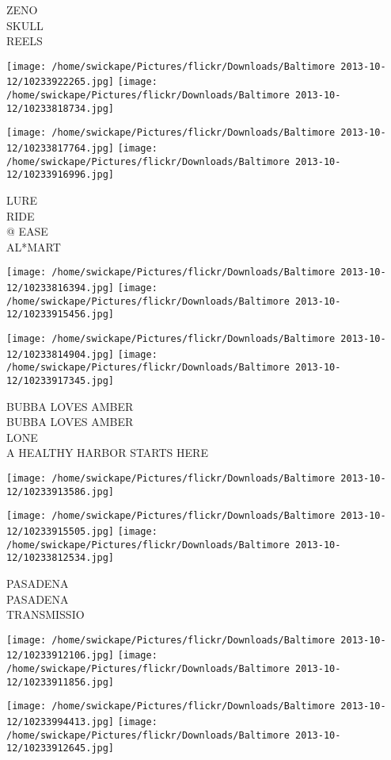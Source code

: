 \documentclass[10pt,letterpaper]{article}
\begin{document}
ZENO\\
SKULL\\
REELS
\pagebreak

\texttt{[image: /home/swickape/Pictures/flickr/Downloads/Baltimore 2013-10-12/10233922265.jpg]}
\texttt{[image: /home/swickape/Pictures/flickr/Downloads/Baltimore 2013-10-12/10233818734.jpg]}

\texttt{[image: /home/swickape/Pictures/flickr/Downloads/Baltimore 2013-10-12/10233817764.jpg]}
\texttt{[image: /home/swickape/Pictures/flickr/Downloads/Baltimore 2013-10-12/10233916996.jpg]}

LURE\\
RIDE\\
@ EASE\\
AL*MART
\pagebreak

\texttt{[image: /home/swickape/Pictures/flickr/Downloads/Baltimore 2013-10-12/10233816394.jpg]}
\texttt{[image: /home/swickape/Pictures/flickr/Downloads/Baltimore 2013-10-12/10233915456.jpg]}

\texttt{[image: /home/swickape/Pictures/flickr/Downloads/Baltimore 2013-10-12/10233814904.jpg]}
\texttt{[image: /home/swickape/Pictures/flickr/Downloads/Baltimore 2013-10-12/10233917345.jpg]}

BUBBA LOVES AMBER\\
BUBBA LOVES AMBER\\
LONE\\
A HEALTHY HARBOR STARTS HERE
\pagebreak

\texttt{[image: /home/swickape/Pictures/flickr/Downloads/Baltimore 2013-10-12/10233913586.jpg]}

\vspace{0.25in}
\texttt{[image: /home/swickape/Pictures/flickr/Downloads/Baltimore 2013-10-12/10233915505.jpg]}
\texttt{[image: /home/swickape/Pictures/flickr/Downloads/Baltimore 2013-10-12/10233812534.jpg]}

PASADENA\\
PASADENA\\
TRANSMISSIO
\pagebreak

\texttt{[image: /home/swickape/Pictures/flickr/Downloads/Baltimore 2013-10-12/10233912106.jpg]}
\texttt{[image: /home/swickape/Pictures/flickr/Downloads/Baltimore 2013-10-12/10233911856.jpg]}

\texttt{[image: /home/swickape/Pictures/flickr/Downloads/Baltimore 2013-10-12/10233994413.jpg]}
\texttt{[image: /home/swickape/Pictures/flickr/Downloads/Baltimore 2013-10-12/10233912645.jpg]}
\end{document}
